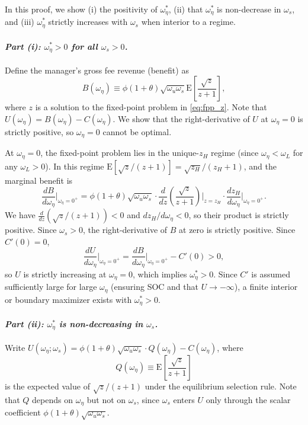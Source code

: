 
    In this proof, we show (i) the positivity of $\omega_\eta^*$, (ii) that $\omega_\eta^*$ is non-decrease in $\omega_s$, and (iii) $\omega_\eta^*$ strictly increases with $\omega_s$ when interior to a regime.
    
    \paragraph{\textit{\textmd{Part (i): $\omega_\eta^* > 0$ for all $\omega_s > 0$.}}}
    
    Define the manager's gross fee revenue (benefit) as
    \[
    B(\omega_\eta) \equiv \phi(1+\theta)\sqrt{\omega_u \omega_s} \mathrm{E}\left[\frac{\sqrt{z}}{z+1}\right],
    \]
    where $z$ is a solution to the fixed-point problem in \eqref{eq:fpp_z}. Note that $U(\omega_\eta) = B(\omega_\eta) - C(\omega_\eta)$. We show that the right-derivative of $U$ at $\omega_\eta = 0$ is strictly positive, so $\omega_\eta = 0$ cannot be optimal. 
    
    At $\omega_\eta = 0$, the fixed-point problem lies in the unique-$z_H$ regime (since $\omega_\eta < \omega_L$ for any $\omega_L > 0$). In this regime $\mathrm{E}[\sqrt{z}/(z+1)] = \sqrt{z_H}/(z_H+1)$, and the marginal benefit is
    \[
    \frac{dB}{d\omega_\eta}\bigg|_{\omega_\eta=0^+}
    = \phi(1+\theta)\sqrt{\omega_u \omega_s}
    \cdot \frac{d}{dz}\left(\frac{\sqrt{z}}{z+1}\right)\bigg|_{z=z_H}
    \cdot \frac{dz_H}{d\omega_\eta}\bigg|_{\omega_\eta=0^+}.
    \]
    We have $\frac{d}{dz}(\sqrt{z}/(z+1)) < 0$ and $dz_H/d\omega_\eta < 0$, so their product is strictly positive. Since $\omega_s > 0$, the right-derivative of $B$ at zero is strictly positive. Since $C'(0) = 0$,
    \[
    \frac{dU}{d\omega_\eta}\bigg|_{\omega_\eta = 0^+}
    = \frac{dB}{d\omega_\eta}\bigg|_{\omega_\eta=0^+} - C'(0) > 0,
    \]
    so $U$ is strictly increasing at $\omega_\eta = 0$, which implies $\omega_\eta^* > 0$. Since $C'$ is assumed sufficiently large for large $\omega_\eta$ (ensuring SOC and that $U \to -\infty$), a finite interior or boundary maximizer exists with $\omega_\eta^* > 0$.
    
    \paragraph{\textit{\textmd{Part (ii): $\omega_\eta^*$ is non-decreasing in $\omega_s$.}}}
    
    Write $U(\omega_\eta; \omega_s) = \phi(1+\theta)\sqrt{\omega_u \omega_s} \cdot Q(\omega_\eta) - C(\omega_\eta)$, where
    \[
    Q(\omega_\eta) \equiv \mathrm{E}\left[\frac{\sqrt{z}}{z+1}\right]
    \]
    is the expected value of $\sqrt{z}/(z+1)$ under the equilibrium selection rule. Note that $Q$ depends on $\omega_\eta$ but not on $\omega_s$, since $\omega_s$ enters $U$ only through the scalar coefficient $\phi(1+\theta)\sqrt{\omega_u \omega_s}$.
    
